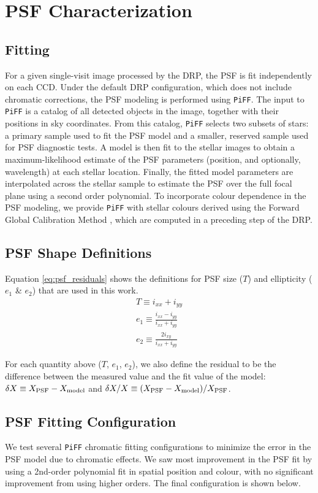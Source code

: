 \section{PSF Characterization}
\subsection{Fitting}
For a given single-visit image processed by the DRP, the PSF is fit independently on each CCD. 
Under the default DRP configuration, which does not include chromatic corrections, the PSF 
modeling is performed using \texttt{PiFF}. The input to \texttt{PiFF} is a catalog of all 
detected objects in the image, together with their positions in sky coordinates. From this 
catalog, \texttt{PiFF} selects two subsets of stars: a primary sample used to fit the PSF 
model and a smaller, reserved sample used for PSF diagnostic tests. A model is then fit to the stellar images to obtain a maximum-likelihood 
estimate of the PSF parameters (position, and optionally, wavelength) at each stellar location. Finally, the fitted model parameters are interpolated across 
the stellar sample to estimate the PSF over the full focal plane using a second order polynomial. To incorporate colour 
dependence in the PSF modeling, we provide \texttt{PiFF} with stellar colours derived using the 
Forward Global Calibration Method \citep[FGCM;][]{2018AJ....155...41B}, which are computed in a preceding 
step of the DRP.

\subsection{PSF Shape Definitions}
Equation \ref{eq:psf_residuals} shows the definitions for PSF size ($T$) and ellipticity ($e_1$ \& $e_2$) that are used in this work.
\begin{equation}
\label{eq:psf_residuals}
    \begin{aligned}
        T \equiv i_{xx} + i_{yy}  \\
        e_1 \equiv \frac{i_{xx}-i_{yy}}{i_{xx}+i_{yy}}\\
        e_2 \equiv \frac{2i_{xy}}{i_{xx}+i_{yy}}
    \end{aligned}
\end{equation}

For each quantity above ($T$, $e_1$, $e_2$), we also define the residual to be the difference between the measured value and the fit value of the model: $\delta X \equiv X_{\rm PSF} - X_{\rm model}$ and $\delta X/X \equiv (X_{\rm PSF}-X_{\rm model})/X_{\rm PSF}$.

\subsection{PSF Fitting Configuration}
We test several \texttt{PiFF} chromatic fitting configurations to minimize the error in the PSF model due to chromatic effects. 
We saw most improvement in the PSF fit by using a 2nd-order polynomial fit in spatial position and colour, with no significant improvement from using higher orders. 
The final configuration is shown below.
